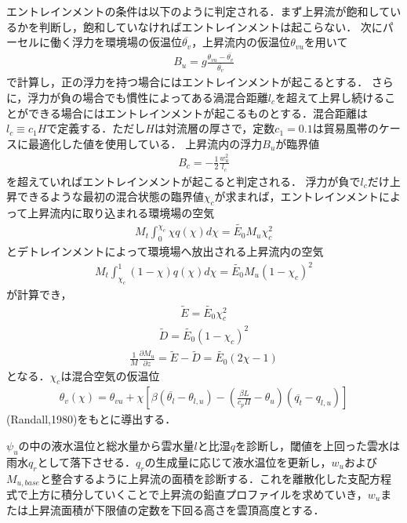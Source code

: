エントレインメントの条件は以下のように判定される．まず上昇流が飽和しているかを判断し，飽和していなければエントレインメントは起こらない．
次にパーセルに働く浮力を環境場の仮温位\(\overline{\theta_v}\)，上昇流内の仮温位\(\theta_{vu}\)を用いて
\begin{eqnarray}B_u = g\frac{\theta_{vu} - \overline{\theta_{v}}}{ \overline{\theta_v}}\end{eqnarray}
で計算し，正の浮力を持つ場合にはエントレインメントが起こるとする．
さらに，浮力が負の場合でも慣性によってある渦混合距離\(l_c\)を超えて上昇し続けることができる場合にはエントレインメントが起こるものとする．混合距離は\(l_c \equiv c_1 H\)で定義する．ただし\(H\)は対流層の厚さで，定数\(c_1=0.1\)は貿易風帯のケースに最適化した値を使用している．
上昇流内の浮力\(B_u\)が臨界値 \begin{eqnarray}B_c = -\frac{1}{2}\frac{w_u^2}{l_c}\end{eqnarray}
を超えていればエントレインメントが起こると判定される．
浮力が負で\(l_c\)だけ上昇できるような最初の混合状態の臨界値\(\chi_c\)が求まれば，エントレインメントによって上昇流内に取り込まれる環境場の空気
\begin{eqnarray} M_t\int_0^{\chi_c}\chi q(\chi) d\chi = \tilde{E_0} M_u \chi_c^2 \end{eqnarray}
とデトレインメントによって環境場へ放出される上昇流内の空気
\begin{eqnarray} M_t\int_{\chi_c}^{1}(1-\chi) q(\chi) d\chi = \tilde{E_0} M_u (1-\chi_c)^2 \end{eqnarray}
が計算でき， \begin{eqnarray}\tilde{E}=\tilde{E_0}\chi_c^2\end{eqnarray}
\begin{eqnarray}\tilde{D}=\tilde{E_0}(1-\chi_c)^2\end{eqnarray}
\begin{eqnarray}\frac{1}{M}\frac{\partial M_u}{\partial z}= \tilde{E} - \tilde{D} = \tilde{E_0}(2\chi - 1)\end{eqnarray}
となる．\(\chi_c\)は混合空気の仮温位
\begin{eqnarray}\theta_v(\chi)=\theta_{vu}+\chi\left[ \beta(\overline{\theta_l}-\theta_{l,u})-\left(\frac{\beta L}{c_p\Pi}-\theta_u\right)(\overline{q_t}-q_{l,u})\right]\end{eqnarray}
(Randall,1980)をもとに導出する．

\(\psi_u\)の中の液水温位と総水量から雲水量\(l\)と比湿\(q\)を診断し，閾値を上回った雲水は雨水\(q_r\)として落下させる．\(q_r\)の生成量に応じて液水温位を更新し，\(w_u\)および\(M_{u,base}\)と整合するように上昇流の面積を診断する．これを離散化した支配方程式で上方に積分していくことで上昇流の鉛直プロファイルを求めていき，\(w_u\)または上昇流面積が下限値の定数を下回る高さを雲頂高度とする．

